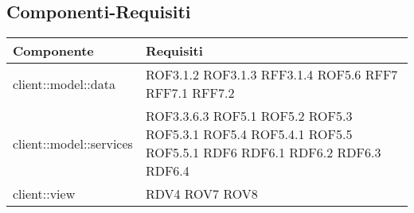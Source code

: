 \subsection{Componenti-Requisiti} %
\label{sub:componenti_requisiti}
\begin{center}
\def\arraystretch{1.5}
\bgroup
\begin{longtable}{| p{9cm} | p{4cm} |}
\hline
\textbf{Componente} & \textbf{Requisiti} \\
\hline
client::model::data  &  ROF3.1.2 \newline ROF3.1.3 \newline RFF3.1.4 \newline ROF5.6 \newline RFF7 \newline RFF7.1 \newline RFF7.2 \newline \\
\hline
client::model::services  & ROF3.3.6.3 \newline ROF5.1 \newline ROF5.2 \newline ROF5.3 \newline ROF5.3.1  \newline ROF5.4 \newline ROF5.4.1 \newline ROF5.5 \newline ROF5.5.1 \newline RDF6 \newline RDF6.1 \newline RDF6.2 \newline RDF6.3 \newline RDF6.4 \newline \\
\hline
client::view  & RDV4 \newline ROV7 \newline ROV8 \\
\hline

\end{longtable}
\end{center}

